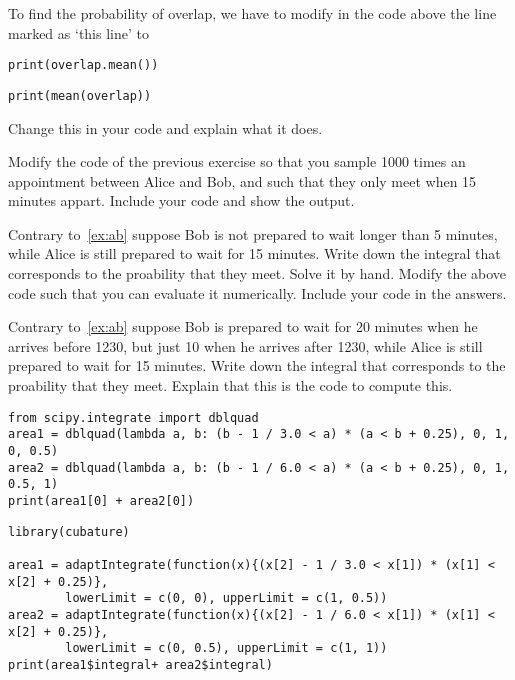 \begin{exercise}
To find the probability of overlap, we have to modify in the code above the line marked as `this line' to
\begin{verbatim}
print(overlap.mean())
\end{verbatim}

\begin{verbatim}
print(mean(overlap))
\end{verbatim}

Change this in your code and explain what it does.
\end{exercise}


\begin{exercise}
Modify the  code of the previous exercise so that you sample 1000 times an appointment between Alice and Bob, and such that they only meet when 15 minutes appart. Include your code and show the output.
\end{exercise}


\begin{exercise}
Contrary to~\cref{ex:ab} suppose Bob is not prepared to wait longer than 5 minutes, while Alice is still prepared to wait for 15 minutes. Write down the integral that corresponds to the proability that they meet.  Solve it by hand. Modify the above code such that you can evaluate it numerically. Include your code in the answers.
\end{exercise}

\begin{exercise}
Contrary to~\cref{ex:ab} suppose Bob is prepared to wait for 20 minutes when he arrives before 1230, but just 10 when he arrives after 1230, while Alice is still prepared to wait for 15 minutes. Write down the integral that corresponds to the proability that they meet. Explain that this is the code to compute this.

\begin{verbatim}
from scipy.integrate import dblquad
area1 = dblquad(lambda a, b: (b - 1 / 3.0 < a) * (a < b + 0.25), 0, 1, 0, 0.5)
area2 = dblquad(lambda a, b: (b - 1 / 6.0 < a) * (a < b + 0.25), 0, 1, 0.5, 1)
print(area1[0] + area2[0])
\end{verbatim}

\begin{verbatim}
library(cubature)   

area1 = adaptIntegrate(function(x){(x[2] - 1 / 3.0 < x[1]) * (x[1] < x[2] + 0.25)},
		lowerLimit = c(0, 0), upperLimit = c(1, 0.5))
area2 = adaptIntegrate(function(x){(x[2] - 1 / 6.0 < x[1]) * (x[1] < x[2] + 0.25)}, 
		lowerLimit = c(0, 0.5), upperLimit = c(1, 1))
print(area1$integral+ area2$integral)
\end{verbatim}

\end{exercise}

